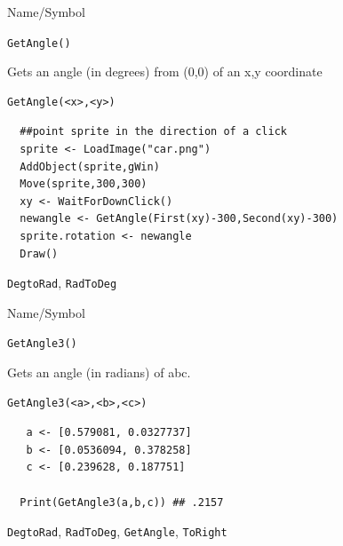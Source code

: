 \begin{desc}{Name/Symbol}
\item[Name/Symbol]	\verb+GetAngle()+

\item[Description]	Gets  an angle (in degrees) from (0,0) of an x,y coordinate


\item[Usage]
\begin{verbatim}
GetAngle(<x>,<y>)
\end{verbatim}

\item[Example]	
\begin{verbatim}
  ##point sprite in the direction of a click   
  sprite <- LoadImage("car.png")
  AddObject(sprite,gWin)
  Move(sprite,300,300)
  xy <- WaitForDownClick()
  newangle <- GetAngle(First(xy)-300,Second(xy)-300)
  sprite.rotation <- newangle
  Draw()
\end{verbatim}

\item[See Also]	\verb+DegtoRad+, \verb+RadToDeg+
\end{desc}


\begin{desc}{Name/Symbol}
\item[Name/Symbol]	\verb+GetAngle3()+

\item[Description]	Gets  an angle (in radians) of abc.


\item[Usage]
\begin{verbatim}
GetAngle3(<a>,<b>,<c>)
\end{verbatim}

\item[Example]	



\begin{verbatim}
   a <- [0.579081, 0.0327737]
   b <- [0.0536094, 0.378258]
   c <- [0.239628, 0.187751]

  Print(GetAngle3(a,b,c)) ## .2157

\end{verbatim}

\item[See Also]	\verb+DegtoRad+, \verb+RadToDeg+, \verb+GetAngle+, \verb+ToRight+
\end{desc}

